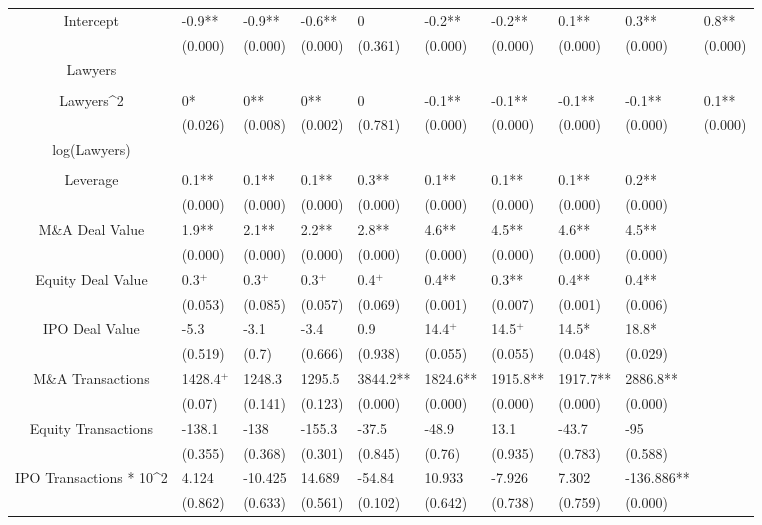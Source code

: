\documentclass{article}
\begin{document}
\begin{table}[H]
\begin{tabular}{|clllllllll|}
Intercept & -0.9** & -0.9** & -0.6** & 0 & -0.2** & -0.2** & 0.1** & 0.3** & 0.8** \\ 
   & (0.000) & (0.000) & (0.000) & (0.361) & (0.000) & (0.000) & (0.000) & (0.000) & (0.000) \\ 
  Lawyers &  &  &  &  &  &  &  &  &  \\ 
   &  &  &  &  &  &  &  &  &  \\ 
  Lawyers^2 & 0* & 0** & 0** & 0 & -0.1** & -0.1** & -0.1** & -0.1** & 0.1** \\ 
   & (0.026) & (0.008) & (0.002) & (0.781) & (0.000) & (0.000) & (0.000) & (0.000) & (0.000) \\ 
  log(Lawyers) &  &  &  &  &  &  &  &  &  \\ 
   &  &  &  &  &  &  &  &  &  \\ 
  Leverage & 0.1** & 0.1** & 0.1** & 0.3** & 0.1** & 0.1** & 0.1** & 0.2** &  \\ 
   & (0.000) & (0.000) & (0.000) & (0.000) & (0.000) & (0.000) & (0.000) & (0.000) &  \\ 
  M\&A Deal Value & 1.9** & 2.1** & 2.2** & 2.8** & 4.6** & 4.5** & 4.6** & 4.5** &  \\ 
   & (0.000) & (0.000) & (0.000) & (0.000) & (0.000) & (0.000) & (0.000) & (0.000) &  \\ 
  Equity Deal Value & 0.3$^{+}$ & 0.3$^{+}$ & 0.3$^{+}$ & 0.4$^{+}$ & 0.4** & 0.3** & 0.4** & 0.4** &  \\ 
   & (0.053) & (0.085) & (0.057) & (0.069) & (0.001) & (0.007) & (0.001) & (0.006) &  \\ 
  IPO Deal Value & -5.3 & -3.1 & -3.4 & 0.9 & 14.4$^{+}$ & 14.5$^{+}$ & 14.5* & 18.8* &  \\ 
   & (0.519) & (0.7) & (0.666) & (0.938) & (0.055) & (0.055) & (0.048) & (0.029) &  \\ 
  M\&A Transactions & 1428.4$^{+}$ & 1248.3 & 1295.5 & 3844.2** & 1824.6** & 1915.8** & 1917.7** & 2886.8** &  \\ 
   & (0.07) & (0.141) & (0.123) & (0.000) & (0.000) & (0.000) & (0.000) & (0.000) &  \\ 
  Equity Transactions & -138.1 & -138 & -155.3 & -37.5 & -48.9 & 13.1 & -43.7 & -95 &  \\ 
   & (0.355) & (0.368) & (0.301) & (0.845) & (0.76) & (0.935) & (0.783) & (0.588) &  \\ 
  IPO Transactions * 10^2 & 4.124 & -10.425 & 14.689 & -54.84 & 10.933 & -7.926 & 7.302 & -136.886** &  \\ 
   & (0.862) & (0.633) & (0.561) & (0.102) & (0.642) & (0.738) & (0.759) & (0.000) &  \\ 

\end{tabular}
\end{table}
\end{document}
